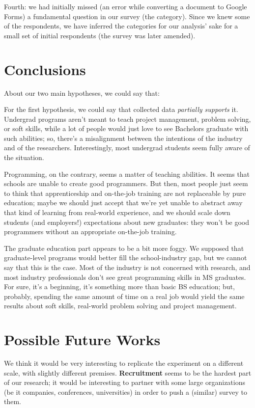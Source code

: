 \documentclass{sigchi}
\begin{document}
Fourth: we had initially missed (an error while converting a document to Google Forms) a fundamental question in our survey (the category). Since we knew some of the respondents, we have inferred the categories for our analysis' sake for a small set of initial respondents (the survey was later amended).

\section{Conclusions}
About our two main hypotheses, we could say that:

For the first hypothesis, we could say that collected data \textit{partially supports} it. Undergrad programs aren't meant to teach project management, problem solving, or soft skills, while a lot of people would just love to see Bachelors graduate with such abilities; so, there's a misalignment between the intentions of the industry and of the researchers. Interestingly, most undergrad students seem fully aware of the situation.

Programming, on the contrary, seems a matter of teaching abilities. It seems that schools are unable to create good programmers. But then, most people just seem to think that apprenticeship and on-the-job training are not replaceable by pure education; maybe we should just accept that we're yet unable to abstract away that kind of learning from real-world experience, and we should scale down students (and employers!) expectations about new graduates: they won't be good programmers without an appropriate on-the-job training.

The graduate education part appears to be a bit more foggy. We supposed that graduate-level programs would better fill the school-industry gap, but we cannot say that this is the case. Most of the industry is not concerned with research, and most industry professionals don't see great programming skills in MS graduates. For sure, it's a beginning, it's something more than basic BS education; but, probably, spending the same amount of time on a real job would yield the same results about soft skills, real-world problem solving and project management.

\section{Possible Future Works}
We think it would be very interesting to replicate the experiment on a different scale, with slightly different premises. \textbf{Recruitment} seems to be the hardest part of our research; it would be interesting to partner with some large organizations (be it companies, conferences, universities) in order to push a (similar) survey to them.
\end{document}
